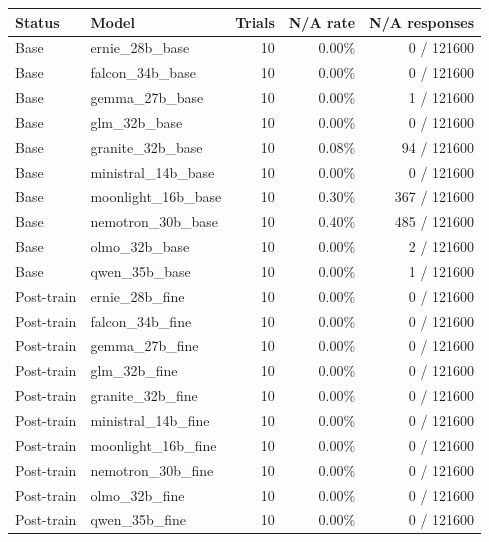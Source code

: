 \small
\begin{tabular}{llrrr}
\toprule
Status & Model & Trials & N/A rate & N/A responses \\
\midrule
Base & ernie\_28b\_base & 10 & 0.00\% & 0 / 121600 \\
Base & falcon\_34b\_base & 10 & 0.00\% & 0 / 121600 \\
Base & gemma\_27b\_base & 10 & 0.00\% & 1 / 121600 \\
Base & glm\_32b\_base & 10 & 0.00\% & 0 / 121600 \\
Base & granite\_32b\_base & 10 & 0.08\% & 94 / 121600 \\
Base & ministral\_14b\_base & 10 & 0.00\% & 0 / 121600 \\
Base & moonlight\_16b\_base & 10 & 0.30\% & 367 / 121600 \\
Base & nemotron\_30b\_base & 10 & 0.40\% & 485 / 121600 \\
Base & olmo\_32b\_base & 10 & 0.00\% & 2 / 121600 \\
Base & qwen\_35b\_base & 10 & 0.00\% & 1 / 121600 \\
\midrule
Post-train & ernie\_28b\_fine & 10 & 0.00\% & 0 / 121600 \\
Post-train & falcon\_34b\_fine & 10 & 0.00\% & 0 / 121600 \\
Post-train & gemma\_27b\_fine & 10 & 0.00\% & 0 / 121600 \\
Post-train & glm\_32b\_fine & 10 & 0.00\% & 0 / 121600 \\
Post-train & granite\_32b\_fine & 10 & 0.00\% & 0 / 121600 \\
Post-train & ministral\_14b\_fine & 10 & 0.00\% & 0 / 121600 \\
Post-train & moonlight\_16b\_fine & 10 & 0.00\% & 0 / 121600 \\
Post-train & nemotron\_30b\_fine & 10 & 0.00\% & 0 / 121600 \\
Post-train & olmo\_32b\_fine & 10 & 0.00\% & 0 / 121600 \\
Post-train & qwen\_35b\_fine & 10 & 0.00\% & 0 / 121600 \\
\hline
\end{tabular}
